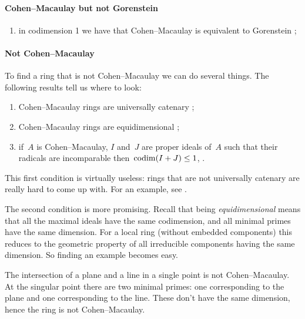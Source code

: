 \documentclass[10pt,a4paper]{article}
\begin{document}
\paragraph{Cohen--Macaulay but not Gorenstein}

\begin{enumerate}
  \item in codimension 1 we have that Cohen--Macaulay is equivalent to Gorenstein \cite[corollary 21.20]{eisenbud-commutative-algebra};
\end{enumerate}

\paragraph{Not Cohen--Macaulay}
To find a ring that is not Cohen--Macaulay we can do several things. The following results tell us where to look:
\begin{enumerate}
  \item Cohen--Macaulay rings are universally catenary \cite[corollary 18.10]{eisenbud-commutative-algebra};
  \item Cohen--Macaulay rings are equidimensional \cite[corollary 18.11]{eisenbud-commutative-algebra};
  \item if~$A$ is Cohen--Macaulay, $I$ and~$J$ are proper ideals of~$A$ such that their radicals are incomparable \expand then~$\operatorname{codim}(I+J)\leq 1$, \cite[theorem 18.12]{eisenbud-commutative-algebra}.
\end{enumerate}
This first condition is virtually useless: rings that are not universally catenary are really hard to come up with. For an example, see .

The second condition is more promising. Recall that being \emph{equidimensional} means that all the maximal ideals have the same codimension, and all minimal primes have the same dimension. For a local ring (without embedded components) this reduces to the geometric property of all irreducible components having the same dimension. So finding an example becomes easy.
\begin{example}
  The intersection of a plane and a line in a single point is not Cohen--Macaulay. At the singular point there are two minimal primes: one corresponding to the plane and one corresponding to the line. These don't have the same dimension, hence the ring is not Cohen--Macaulay.
\end{example}
\end{document}
